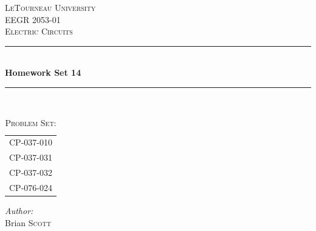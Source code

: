 \begin{titlepage}
\newcommand{\HRule}{\rule{\linewidth}{0.4mm}} %

\center %
 

\textsc{\LARGE LeTourneau University}\\[1.5cm] %
\textsc{\Large EEGR 2053-01}\\[0.5cm] %
\textsc{\large Electric Circuits}\\[0.5cm] %


\HRule \\[0.4cm]
{ \huge \bfseries Homework Set 14}\\[0.2cm] %
\HRule \\[1.5cm]
 

\begin{table}[h]
\large
\ttfamily
\centering
\caption*{\textsc{\large Problem Set:}}
\begin{tabular}{l}
CP-037-010 \\
CP-037-031 \\
CP-037-032 \\ 
CP-076-024 \\[1.5cm]
\end{tabular}
\end{table}


\Large \emph{Author:}\\
Brian \textsc{Scott}\\[1cm] %


\end{titlepage}
